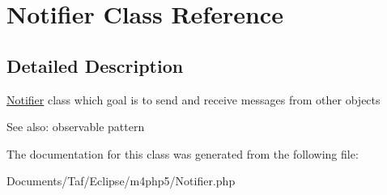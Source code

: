 \hypertarget{classNotifier}{
\section{Notifier Class Reference}
\label{classNotifier}
}


\subsection{Detailed Description}
\hyperlink{classNotifier}{Notifier} class which goal is to send and receive messages from other objects \begin{Desc}
\item[See also:]observable pattern \end{Desc}


The documentation for this class was generated from the following file:\begin{CompactItemize}
\item 
Documents/Taf/Eclipse/m4php5/Notifier.php\end{CompactItemize}
